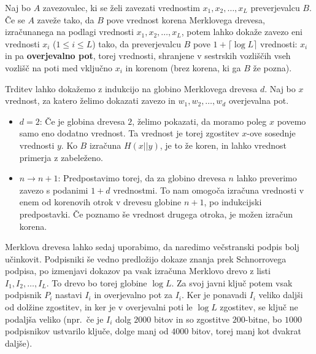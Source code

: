 \documentclass[isrm2, tisk]{fmfdelo}
\begin{document}
\begin{trditev}
\label{trd:overjevalna_pot}
    Naj bo $A$ zavezovalec, ki se želi zavezati vrednostim $x_1, x_2, \dots, x_L$ preverjevalcu $B$. Če
    se $A$ zaveže tako, da $B$ pove vrednost korena Merklovega drevesa, izračunanega na podlagi
    vrednosti $x_1, x_2, \dots, x_L$, potem lahko dokaže zavezo eni vrednosti $x_i$ ($1 \le i \le L$)
    tako, da preverjevalcu $B$ pove $1 + \lceil \log L \rceil$ vrednosti: $x_i$ in pa \textbf{overjevalno
    pot}, torej vrednosti, shranjene v sestrskih vozliščih vseh vozlišč na poti med vključno $x_i$ in
    korenom (brez korena, ki ga $B$ že pozna).
\end{trditev}

\begin{dokaz}
    Trditev lahko dokažemo z indukcijo na globino Merklovega drevesa $d$. Naj bo $x$ vrednost, za katero
    želimo dokazati zavezo in $w_1, w_2, \dots, w_d$ overjevalna pot.
    \begin{itemize}
        \item $d = 2$: Če je globina drevesa $2$, želimo pokazati, da moramo poleg $x$ povemo samo eno
            dodatno vrednost. Ta vrednost je torej zgostitev $x$-ove sosednje vrednosti $y$. Ko $B$ izračuna
            $H(x || y)$, je to že koren, in lahko vrednost primerja z zabeleženo.
        \item $n \rightarrow n + 1$: Predpostavimo torej, da za globino drevesa $n$ lahko preverimo zavezo s
            podanimi $1 + d$ vrednostmi. To nam omogoča izračuna vrednosti v enem od korenovih otrok v
            drevesu globine $n + 1$, po indukcijski predpostavki. Če poznamo še vrednost drugega otroka, je
            možen izračun korena.
    \end{itemize}
\end{dokaz}

Merklova drevesa lahko sedaj uporabimo, da naredimo večstranski podpis bolj učinkovit. Podpisniki
še vedno predložijo dokaze znanja prek Schnorrovega podpisa, po izmenjavi dokazov pa vsak izračuna
Merklovo drevo z listi $I_1, I_2, \dots, I_L$. To drevo bo torej globine $\log L$. Za svoj javni
ključ potem vsak podpisnik $P_i$ nastavi $I_i$ in overjevalno pot za $I_i$. Ker je ponavadi $I_i$
veliko daljši od dolžine zgostitev, in ker je v overjevalni poti le $\log L$ zgostitev, se ključ
ne podaljša veliko (npr.\, če je $I_i$ dolg $2000$ bitov in so zgostitve $200$-bitne, bo $1000$
podpisnikov ustvarilo ključe, dolge manj od $4000$ bitov, torej manj kot dvakrat daljše).
\end{document}
